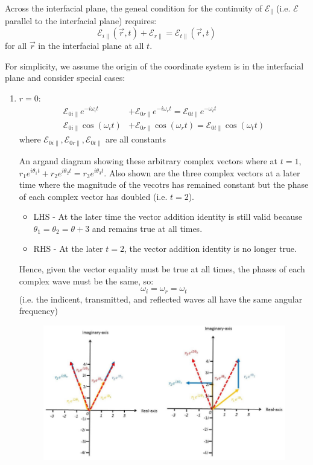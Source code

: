 \documentclass[a4paper, 11pt, normalem]{report}
\newcommand\E{\mathcal{E}}
\newcommand\vr{\vec{r}}
\newcommand\om{\omega}
\begin{document}
Across the interfacial plane, the geneal condition for the continuity of $\E_{\parallel}$ (i.e. $\E$ parallel to the interfacial plane) requires:
\begin{equation}
	\E_{i\parallel} (\vr,t) + \E_{r\parallel} = \E_{t\parallel}(\vr,t)
\end{equation}
for all $\vr$ in the interfacial plane at all $t$.

For simplicity, we assume the origin of the coordinate system is in the interfacial plane and consider special cases:
\begin{enumerate}
	\item $r=0$:
	\begin{align}
		\E_{0i\parallel}e^{-i\om_it} &+ \E_{0r\parallel}e^{-i\om_rt} = \E_{0t\parallel}e^{-\om_tt} \\
		\E_{0i\parallel}\cos(\om_it) &+ \E_{0r\parallel}\cos(\om_rt) = \E_{0t\parallel}\cos(\om_tt)
	\end{align}
	where $\E_{0i\parallel},\E_{0r\parallel},\E_{0t\parallel}$ are all constants

	An argand diagram showing these arbitrary complex vectors where at $t=1$, $r_1e^{i\theta_1t} + r_2e^{i\theta_2t} = r_3e^{i\theta_3t}$.
	Also shown are the three complex vectors at a later time where the magnitude of the vecotrs has remained constant but the phase of each complex vector has doubled (i.e. $t=2$).
	\begin{itemize}
		\item LHS - At the later time the vector addition identity is still valid because $\theta_1 = \theta_2 = \theta+3$ and remains true at all times.
		\item RHS - At the later $t=2$, the vector addition identity is no longer true.
	\end{itemize}
	Hence, given the vector equality must be true at all times, the phases of each complex wave must be the same, so:
	\begin{equation}
		\om_i = \om_r = \om_t
	\end{equation}
	(i.e. the indicent, transmitted, and reflected waves all have the same angular frequency)

	\begin{figure}[H]
		\centering
		\includegraphics[scale=0.4]{argand.png}
	\end{figure}


\end{enumerate}
\end{document}
